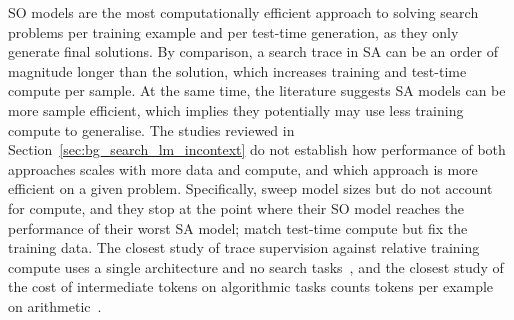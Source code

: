 SO models are the most computationally efficient approach to solving search problems per training example and per test-time generation, as they only generate final solutions.
By comparison, a search trace in SA can be an order of magnitude longer than the solution, which increases training and test-time compute per sample.
At the same time, the literature suggests SA models can be more sample efficient, which implies they potentially may use less training compute to generalise.
The studies reviewed in Section~\ref{sec:bg_search_lm_incontext} do not establish how performance of both approaches scales with more data and compute, and which approach is more efficient on a given problem.
Specifically, \citet{lehnertBetterPlanningTransformers2024} sweep model sizes but do not account for compute, and they stop at the point where their SO model reaches the performance of their worst SA model; \citet{qinBacktrackNotBacktrack2025} match test-time compute but fix the training data.
The closest study of trace supervision against relative training compute uses a single architecture and no search tasks~\citep{pengmeiKineticsReasoning2025}, and the closest study of the cost of intermediate tokens on algorithmic tasks counts tokens per example on arithmetic~\citep{leeTeachingArithmeticSmall2023}.

